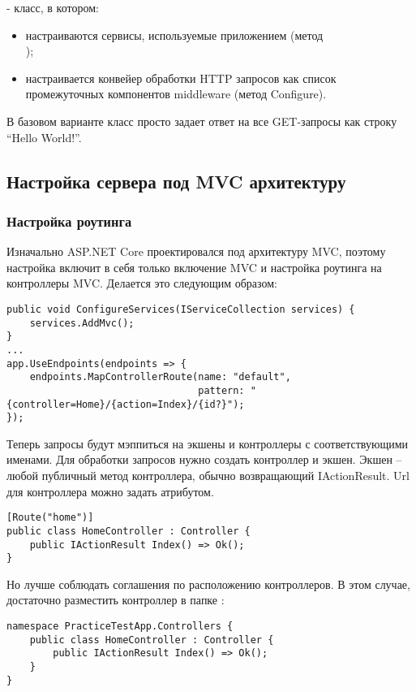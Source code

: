 \documentclass[a4paper,14pt]{extarticle}
\begin{document}
 - класс, в котором:

\begin{itemize}
    \item настраиваются сервисы, используемые приложением (метод\\
          );
    \item настраивается конвейер обработки HTTP запросов как список
          промежуточных компонентов middleware (метод Configure).
\end{itemize}

В базовом варианте класс просто задает ответ на все GET-запросы как строку
\enquote{Hello World!}.

\subsection{Настройка сервера под MVC архитектуру}
\subsubsection{Настройка роутинга}

Изначально ASP.NET Core проектировался под архитектуру MVC, поэтому настройка
включит в себя только включение MVC и настройка роутинга на контроллеры
MVC. Делается это следующим образом:

\begin{lstlisting}
public void ConfigureServices(IServiceCollection services) {
    services.AddMvc();
}
...
app.UseEndpoints(endpoints => {
    endpoints.MapControllerRoute(name: "default",
                                 pattern: "{controller=Home}/{action=Index}/{id?}");
});
\end{lstlisting}

Теперь запросы будут мэппиться на экшены и контроллеры с соответствующими
именами. Для обработки запросов нужно создать контроллер и экшен. Экшен -- любой
публичный метод контроллера, обычно возвращающий IActionResult. Url для
контроллера можно задать атрибутом.

\begin{lstlisting}
[Route("home")] 
public class HomeController : Controller {
    public IActionResult Index() => Ok();
}
\end{lstlisting}

Но лучше соблюдать соглашения по расположению контроллеров. В этом случае,
достаточно разместить контроллер в папке :

\begin{lstlisting}
namespace PracticeTestApp.Controllers { 
    public class HomeController : Controller {
        public IActionResult Index() => Ok();
    }
}
\end{lstlisting}
\end{document}
